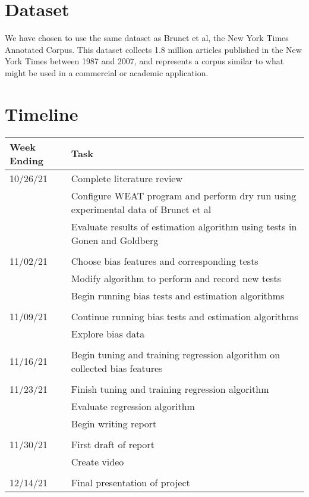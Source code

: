 \documentclass{article}
\begin{document}
\section{Dataset}

We have chosen to use the same dataset as Brunet et al, the New York
Times Annotated Corpus\cite{sandhaus_evan_new_2008}. This dataset
collects 1.8 million articles published in the New York Times between
1987 and 2007, and represents a corpus similar to what might be used in
a commercial or academic application\cite{brunet_understanding_2019}.

\section{Timeline}

\begin{tabular}{p{1in}|p{\dimexpr\linewidth-1in-4\tabcolsep}}
    \hline
    \textbf{Week Ending} & \textbf{Task} \\
    \hline
    10/26/21 & Complete literature review \\
             & Configure WEAT program and perform dry run using
             experimental data of Brunet et
             al\cite{brunet_understanding_2019} \\
             & Evaluate results of estimation algorithm using tests in
             Gonen and Goldberg\cite{gonen_lipstick_2019} \\
             &\\
    11/02/21 & Choose bias features and corresponding tests \\
             & Modify algorithm to perform and record new tests \\
             & Begin running bias tests and estimation algorithms \\
             &\\
    11/09/21 & Continue running bias tests and estimation algorithms \\
             & Explore bias data \\
             &\\
    11/16/21 & Begin tuning and training regression algorithm on
    collected bias features \\
             &\\
    11/23/21 & Finish tuning and training regression algorithm \\
             & Evaluate regression algorithm \\
             & Begin writing report \\
             &\\
    11/30/21 & First draft of report \\
             & Create video \\
             &\\
    12/14/21 & Final presentation of project \\
    \hline
\end{tabular}
    
\end{document}
